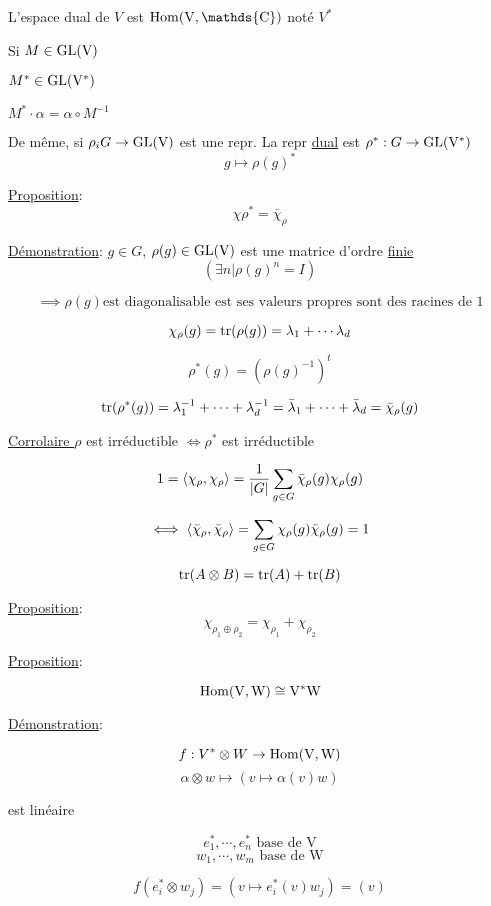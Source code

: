 L'espace dual de $V$ est $\rm{Hom}(V, \mathds{C})$ noté $V^{*}$

Si $M \in \rm{GL}(V) $ 

$M^{*} \in \rm{GL}(V^{*}) $  

$M^{*} \cdot \alpha = \alpha \circ M ^{-1}$

De même, si $\rho_{i} G \to \rm{GL}(V)$ est une repr. La repr \underline{dual} est $\rho^{*}: G \to \rm{GL}(V^{*})$ 
\[ g \mapsto \rho(g)^{*} \]

\underline{Proposition}: \[  \chi \rho ^{*} = \bar \chi_{\rho}  \] 

\underline{Démonstration}: 	
$g \in G$, $\rho(g) \in \rm{GL}(V)$ est une matrice d'ordre \underline{finie} 
\[ \left( \exists n | \rho(g)^n = I\right)  \]

\[ \implies \rho(g) \text{est diagonalisable est ses valeurs propres sont des racines de 1}   \]

\[ \chi_{\rho} (g) = \tr(\rho(g)) = \lambda_1 + \dotsb \lambda_d\]

\[ \rho^{*}(g) = (\rho(g)^{-1})^t  \]

\[ \tr(\rho^{*}(g)) = \lambda_1^{-1} + \dotsb + \lambda_d^{-1} = \bar \lambda_1 + \dotsb + \bar \lambda_d = \bar \chi_{\rho} (g) \]

\underline{Corrolaire } $\rho$ est irréductible $\iff \rho^{*}$ est irréductible

\[ 1 = \expval{\chi_{\rho}, \chi_{\rho}}  = \frac{1}{\abs{G}	} \sum_{g \in G} \bar \chi_{\rho} (g) \chi_{\rho} (g)   \]

\[ \iff \expval{\bar \chi_{\rho} , \bar \chi_{\rho} }  = \sum_{g \in G} \chi_{\rho} (g) \bar \chi_{\rho} (g) = 1\]

\[ \tr(A \otimes B) = \tr(A) + \tr(B) \]

\underline{Proposition}: 
\[ \chi_{\rho_1 \oplus \rho_{2}} = \chi_{\rho_{1}} + \chi_{\rho_2}   \]


\underline{Proposition}:

\[ \rm{Hom}(V, W) \cong V^{*} W \]

\underline{Démonstration}:

\[ f: V^{*} \otimes W \to \rm{Hom}(V, W)\]
\[ \alpha \otimes  w \mapsto (v \mapsto \alpha(v) w) \]

est linéaire 

\[ e_1 ^{*}, \dotsb , e_n ^{*}  \text{ base de V}  \]
\[ w_1 , \dotsb , w_m  \text{ base de W}  \]

\[ f(e_i ^{*} \otimes w_j ) = (v \mapsto e_i ^{*} (v) w_j  ) = (v ) \]

